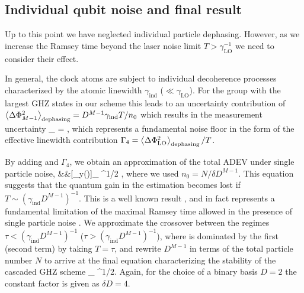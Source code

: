 \subsection{Individual qubit noise and final result}
Up to this point we have neglected individual particle dephasing. 
However, as we increase the Ramsey time beyond the laser noise limit $T > \gamma_\mathrm{LO}^{-1}$ we need to consider their effect.

In general, the clock atoms are subject to individual decoherence processes
 characterized by the atomic linewidth
$\gamma_\mathrm{ind}$ ($\ll \gamma_\mathrm{LO}$). 
For  the group with the largest GHZ states in our scheme this leads to an uncertainty contribution of $\left< \Delta\Phi^2_{M-1} \right>_\mathrm{dephasing} =
D^{M-1}\gamma_\mathrm{ind}T/n_0$ which results in the measurement uncertainty
\bel
	\label{eq:Dephasing_GHZ 2}
	_ =
	 \approx
	,
\eel
which represents a fundamental noise floor in the form of the effective
linewidth contribution $\Gamma_4 =
\left< \Delta\Phi_\mathrm{LO}^2 \right>_\mathrm{dephasing}/T$.

By adding  and $\Gamma_4$, we obtain an approximation of the total
ADEV under single particle noise,
\bal
\label{eq:EK8}
	&&[\sigma_y(\tau)]_ \approx
	^{1/2}
	 \label{eq:sigma_y boxed GHZ 2},
\eal
where we used $n_0=N/\delta D^{M-1}$.
This equation suggests that the quantum gain in the estimation becomes lost if
$T\sim(\gamma_\mathrm{ind}D^{M-1} )^{-1}$. This is a well known result
\cite{Huelga1997}, and in fact represents a fundamental limitation of the
maximal Ramsey time allowed in the presence of single particle noise
\cite{Escher:2011fn}.
We approximate the crossover between the regimes
$\tau<(\gamma_\mathrm{ind}D^{M-1} )^{-1}$ ($\tau>(\gamma_\mathrm{ind}D^{M-1}
)^{-1}$), where  is dominated by the first (second term) by taking
$T=\tau$, and rewrite $D^{M-1}$ in terms of the total particle number $N$ to
arrive at the final equation characterizing the stability of the cascaded GHZ
scheme
_
	\approx
	^{1/2}.
	 \label{eq:sigma_y boxed GHZ 3}
\eel
Again, for the choice of a binary basis $D=2$ the constant factor is given as
$\delta D=4$.


